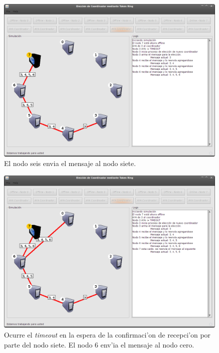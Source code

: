 \begin{figure}[h!]
\centering
 \includegraphics[scale=0.33,keepaspectratio=true]{./imagenes/tokenRing/token3.png}
 \caption{El nodo seis envia el mensaje al nodo siete.}
\end{figure}

\newpage
\begin{figure}[h!]
\centering
 \includegraphics[scale=0.33,keepaspectratio=true]{./imagenes/tokenRing/token4.png}
 \caption{Ocurre el \emph{timeout} en la espera de la confirmaci'on de
recepci'on por parte del nodo siete. El nodo 6 env'ia el mensaje al nodo cero.}
\end{figure}


